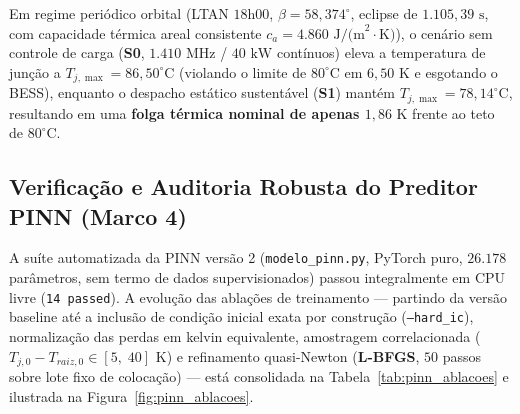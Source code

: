 Em regime periódico orbital (LTAN $18\text{h}00$, $\beta = 58{,}374^\circ$, eclipse de $1.105{,}39\text{ s}$, com capacidade térmica areal consistente $c_a = 4.860\text{ J/(m}^2\cdot\text{K)}$), o cenário sem controle de carga (\textbf{S0}, $1.410\text{ MHz}$ / $40\text{ kW}$ contínuos) eleva a temperatura de junção a $T_{j,\max} = 86{,}50^\circ\text{C}$ (violando o limite de $80^\circ\text{C}$ em $6{,}50\text{ K}$ e esgotando o BESS), enquanto o despacho estático sustentável (\textbf{S1}) mantém $T_{j,\max} = 78{,}14^\circ\text{C}$, resultando em uma \textbf{folga térmica nominal de apenas $1{,}86\text{ K}$} frente ao teto de $80^\circ\text{C}$.

\subsection{Verificação e Auditoria Robusta do Preditor PINN (Marco 4)}
\label{sec:resultados_marco4}

A suíte automatizada da PINN versão 2 (\texttt{modelo\_pinn.py}, PyTorch puro, $26.178$ parâmetros, sem termo de dados supervisionados) passou integralmente em CPU livre (\texttt{14 passed}). A evolução das ablações de treinamento — partindo da versão baseline até a inclusão de condição inicial exata por construção (\texttt{--hard\_ic}), normalização das perdas em kelvin equivalente, amostragem correlacionada ($T_{j,0} - T_{raiz,0} \in [5,\; 40]\text{ K}$) e refinamento quasi-Newton (\textbf{L-BFGS}, $50$ passos sobre lote fixo de colocação) — está consolidada na Tabela~\ref{tab:pinn_ablacoes} e ilustrada na Figura~\ref{fig:pinn_ablacoes}.


